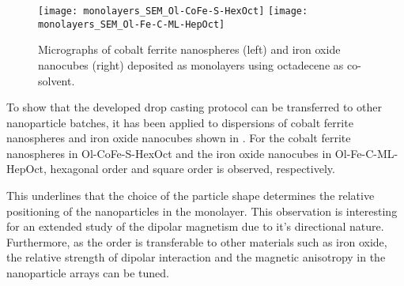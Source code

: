 \documentclass[\main/dresen_thesis.tex]{subfiles}
\begin{document}
  \label{sec:monolayers:preparation:nanoparticleVariation}
    \begin{figure}[tb]
      \centering
      \texttt{[image: monolayers\_SEM\_Ol-CoFe-S-HexOct]}
      \texttt{[image: monolayers\_SEM\_Ol-Fe-C-ML-HepOct]}
      \caption{\label{fig:monolayers:preparation:nanoparticleVariation:spheresIron}Micrographs of cobalt ferrite nanospheres (left) and iron oxide nanocubes (right) deposited as monolayers using octadecene as co-solvent.}
    \end{figure}

    To show that the developed drop casting protocol can be transferred to other nanoparticle batches, it has been applied to dispersions of cobalt ferrite nanospheres and iron oxide nanocubes shown in .
    For the cobalt ferrite nanospheres in Ol-CoFe-S-HexOct and the iron oxide nanocubes in Ol-Fe-C-ML-HepOct, hexagonal order and square order is observed, respectively.

    This underlines that the choice of the particle shape determines the relative positioning of the nanoparticles in the monolayer.
    This observation is interesting for an extended study of the dipolar magnetism due to it's directional nature.
    Furthermore, as the order is transferable to other materials such as iron oxide, the relative strength of dipolar interaction and the magnetic anisotropy in the nanoparticle arrays can be tuned.
\end{document}

